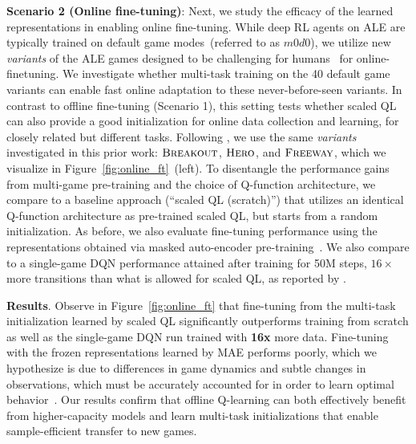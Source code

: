 \textbf{Scenario 2 (Online fine-tuning)}: Next, we study the efficacy of the learned representations in enabling online fine-tuning. While deep RL agents on ALE are typically trained on default game modes~(referred to as $m0d0$), we utilize new \emph{variants} of the ALE games designed to be challenging for humans~\citep{machado18sticky} for online-finetuning. We investigate whether multi-task training on the 40 default game variants can enable fast online adaptation to these never-before-seen variants. In contrast to offline fine-tuning (Scenario 1), this setting tests whether scaled QL can also provide a good initialization for online data collection and learning, for closely related but different tasks. Following \citet{farebrother2018generalization}, we use the same \emph{variants} investigated in this prior work: $\textsc{Breakout}$, $\textsc{Hero}$, and $\textsc{Freeway}$, which we visualize in Figure~\ref{fig:online_ft}~(left).
To disentangle the performance gains from multi-game pre-training and the choice of Q-function architecture, we compare to a baseline approach (``scaled QL (scratch)'') that utilizes an identical Q-function architecture as pre-trained scaled QL, but starts from a random initialization. As before, we also evaluate fine-tuning performance using the representations obtained via masked auto-encoder pre-training~\citep{he2111masked,xiao2022masked}. We also compare to a single-game DQN performance attained after training for 50M steps, $16\times$ more transitions than what is allowed for scaled QL, as reported by \citet{farebrother2018generalization}.

\textbf{Results}. Observe in Figure~\ref{fig:online_ft} that fine-tuning from the multi-task initialization learned by scaled QL significantly outperforms training from scratch as well as the single-game DQN run trained with \textbf{16x} more data. Fine-tuning with the frozen representations learned by MAE performs poorly, which we hypothesize is due to differences in game dynamics and subtle changes in observations, which must be accurately accounted for in order to learn optimal behavior~\citep{dean2022don}. Our results confirm that offline Q-learning can both effectively benefit from higher-capacity models and learn multi-task initializations that enable sample-efficient transfer to new games. 


